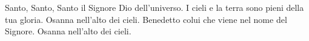 Santo, Santo, Santo il Signore Dio dell'universo. I cieli e la terra sono pieni della tua gloria.
Osanna nell'alto dei cieli.
Benedetto colui che viene nel nome del Signore.
Osanna nell'alto dei cieli.